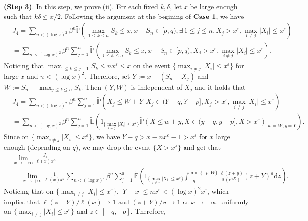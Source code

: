 \documentclass[11pt]{article}
\numberwithin{equation}{section}
\begin{document}
\noindent
{\bf(Step 3)}. In this step, we prove (ii).  For each fixed $k,\delta$, let $x$ be large enough such that $k\delta \leq x/2$. Following the argument at the begining of {\bf Case 1}, we have 
\begin{align}\label{e36-1}
	& J_4 = \sum_{n<(\log x)^2} \beta^{n}\widetilde{\mathbb{P}}\left(\max_{1\leq k \leq n} S_k \leq x, x-S_n\in [p,q), \exists  \ 1\leq j\leq n, X_j>x^\varepsilon,  \max_{i\neq  j} |X_i|\leq x^{\varepsilon}\right) \nonumber\\
	& = \sum_{n<(\log x)^2} \beta^{n}\sum_{j=1}^n \widetilde{\mathbb{P}}\left(\max_{1\leq k \leq n} S_k \leq x, x-S_n\in [p,q),  X_j>x^\varepsilon,  \max_{i\neq  j} |X_i|\leq x^{\varepsilon}\right) .
\end{align}
Noticing that $\max_{1\leq k\leq j-1}S_k \leq nx^{\varepsilon}\leq x$ on the event $\{\max_{i\neq  j} |X_i|\leq x^{\varepsilon}\}$ for large $x$ and $n<(\log x)^2$. Therefore,  set $Y:= x-(S_n- X_j)$ and $W:= S_n-\max_{j\leq k\leq n} S_k$. Then $(Y,W)$ is independent of $X_j$ and it holds that  
\begin{align}
	&J_4 = \sum_{n<(\log x)^2} \beta^{n}\sum_{j=1}^n \widetilde{\mathbb{P}}\left(X_j\leq W+Y, X_j\in (Y-q,Y-p],  X_j>x^\varepsilon,  \max_{i\neq  j} |X_i|\leq x^{\varepsilon}\right) \nonumber\\
	& = \sum_{n<(\log x)^2} \beta^{n}\sum_{j=1}^n \widetilde{\mathbb{E}}\left(1_{\{\max_{i\neq  j} |X_i|\leq x^{\varepsilon} \}} \widetilde{\mathbb{P}}\left(X\leq w+y, X\in (y-q,y-p],  X>x^\varepsilon \right)\big|_{w=W, y=Y} \right).
\end{align}
Since on $\{\max_{i\neq  j} |X_i|\leq x^{\varepsilon} \}$, we have $Y-q >x- nx^{\varepsilon}-1 >x^{\varepsilon}$ for $x$ large enough (depending on $q$), we may drop the event $\{X>x^{\varepsilon}\}$ and get that 
\begin{align}\label{e36-3}
	&\lim_{x\to+\infty} \frac{J_4}{\ell(x)x^a}\nonumber\\
	&= \lim_{x\to+\infty} \frac{1}{\ell (x)x^a} \sum_{n<(\log x)^2} \beta^{n}\sum_{j=1}^n \widetilde{\mathbb{E}}\left(1_{\{\max_{i\neq  j} |X_i|\leq x^{\varepsilon} \}} \int_{-q}^{\min\{-p, W\}}  \frac{\ell(z+y)}{\mathbb{E}(e^{\gamma X})}(z+Y)^a\mathrm{d}z\right).
\end{align}
Noticing that on $\{\max_{i\neq  j} |X_i|\leq x^{\varepsilon} \}$, $|Y-x|\leq nx^{\varepsilon}< (\log x)^2 x^{\varepsilon}$, which implies that $\ell(z+Y)/\ell(x)\to 1$ and $(z+Y)/x\to 1$ as $x\to+\infty$ uniformly on $\{\max_{i\neq  j} |X_i|\leq x^{\varepsilon} \}$ and $z\in [-q, -p]$. Therefore, 
\end{document}
